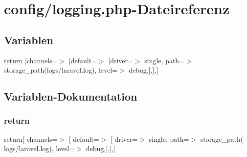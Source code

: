 \hypertarget{logging_8php}{}\section{config/logging.php-\/\+Dateireferenz}
\label{logging_8php}
\subsection*{Variablen}
\begin{DoxyCompactItemize}
\item 
\hyperlink{logging_8php_a014e849e76541231ae7d44ba0fb943bc}{return} \mbox{[}\textquotesingle{}channels\textquotesingle{}=$>$ \mbox{[}\textquotesingle{}default\textquotesingle{}=$>$ \mbox{[}\textquotesingle{}driver\textquotesingle{}=$>$ \textquotesingle{}single\textquotesingle{}, \textquotesingle{}path\textquotesingle{}=$>$ storage\+\_\+path(\textquotesingle{}logs/laravel.\+log\textquotesingle{}), \textquotesingle{}level\textquotesingle{}=$>$ \textquotesingle{}debug\textquotesingle{},\mbox{]},\mbox{]},\mbox{]}
\end{DoxyCompactItemize}


\subsection{Variablen-\/\+Dokumentation}
\mbox{\label{logging_8php_a014e849e76541231ae7d44ba0fb943bc}} 
\subsubsection{\texorpdfstring{return}{return}}
{\footnotesize\ttfamily return\mbox{[} \textquotesingle{}channels\textquotesingle{}=$>$ \mbox{[} \textquotesingle{}default\textquotesingle{}=$>$ \mbox{[} \textquotesingle{}driver\textquotesingle{}=$>$ \textquotesingle{}single\textquotesingle{}, \textquotesingle{}path\textquotesingle{}=$>$ storage\+\_\+path( \textquotesingle{}logs/laravel.\+log\textquotesingle{}), \textquotesingle{}level\textquotesingle{}=$>$ \textquotesingle{}debug\textquotesingle{},\mbox{]},\mbox{]},\mbox{]}}

